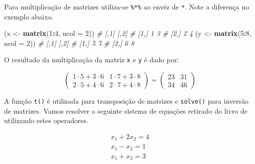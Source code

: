 \documentclass[
]{book}
\newenvironment{Shaded}{\begin{snugshade}}{\end{snugshade}}
\newcommand{\CommentTok}[1]{\textcolor[rgb]{0.56,0.35,0.01}{\textit{#1}}}
\newcommand{\DataTypeTok}[1]{\textcolor[rgb]{0.13,0.29,0.53}{#1}}
\newcommand{\DecValTok}[1]{\textcolor[rgb]{0.00,0.00,0.81}{#1}}
\newcommand{\KeywordTok}[1]{\textcolor[rgb]{0.13,0.29,0.53}{\textbf{#1}}}
\newcommand{\NormalTok}[1]{#1}
\newcommand{\OperatorTok}[1]{\textcolor[rgb]{0.81,0.36,0.00}{\textbf{#1}}}
\newcommand{\StringTok}[1]{\textcolor[rgb]{0.31,0.60,0.02}{#1}}
\begin{document}
Para multiplicação de matrizes utiliza-se \texttt{\%*\%} ao envéz de \texttt{*}. Note a diferença no exemplo abaixo.

\begin{Shaded}
\begin{Highlighting}[]
\NormalTok{(x <-}\StringTok{ }\KeywordTok{matrix}\NormalTok{(}\DecValTok{1}\OperatorTok{:}\DecValTok{4}\NormalTok{, }\DataTypeTok{ncol =} \DecValTok{2}\NormalTok{))}
\CommentTok{#      [,1] [,2]}
\CommentTok{# [1,]    1    3}
\CommentTok{# [2,]    2    4}
\NormalTok{(y <-}\StringTok{ }\KeywordTok{matrix}\NormalTok{(}\DecValTok{5}\OperatorTok{:}\DecValTok{8}\NormalTok{, }\DataTypeTok{ncol =} \DecValTok{2}\NormalTok{))}
\CommentTok{#      [,1] [,2]}
\CommentTok{# [1,]    5    7}
\CommentTok{# [2,]    6    8}
\end{Highlighting}
\end{Shaded}

O resultado da multiplicação da matriz \texttt{x} e \texttt{y} é dado por:

\[
	\left( {\begin{array}{*{20}{c}}{1 \cdot 5 + 3 \cdot 6}&{1 \cdot 7 + 3 \cdot 8}\\{2 \cdot 5 + 4 \cdot 6}&{2 \cdot 7 + 4 \cdot 8}\end{array}} \right) = \left( {\begin{array}{*{20}{c}}{23}&{31}\\{34}&{46}\end{array}} \right)
\]

\begin{Shaded}
\end{Shaded}

A função \texttt{t()}  é utilizada para transposição de matrizes e \texttt{solve()}  para inversão de matrizes. Vamos resolver o seguinte sistema de equações retirado do livro de \citet{Rencher2008} utilizando estes operadores.

\[
	\begin{array}{l}{x_1} + 2{x_2} = 4\\{x_1} - {x_2} = 1\\{x_1} + {x_2} = 3\end{array}
\]
\end{document}
